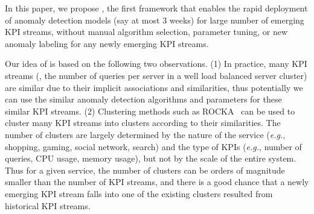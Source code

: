 

In this paper, we propose \name{},  the first framework that enables the rapid deployment of anomaly detection models (say at most 3 weeks) for large number of emerging KPI streams, without manual algorithm selection, parameter tuning, or new anomaly labeling for any newly emerging KPI streams. 

Our idea of \name{} is based on the following two observations.
(1) In practice, many KPI streams (\EG, the number of queries per server in a well load balanced server cluster) are similar due to their implicit associations and similarities, thus potentially we can use the similar anomaly detection algorithms and parameters for these similar KPI streams. (2) Clustering methods such as ROCKA~\cite{lirobust} can be used to cluster many KPI streams into clusters according to their similarities. The number of clusters are largely determined by the nature of the service (\textit{e.g.}, shopping, gaming, social network, search) and the type of KPIs (\textit{e.g.}, number of queries, CPU usage, memory usage), but not by the scale of the entire system. Thus for a given service, the number of clusters can be orders of magnitude smaller than the number of KPI streams, and there is a good chance that a newly emerging KPI stream falls into one of the existing clusters resulted from historical KPI streams. 

